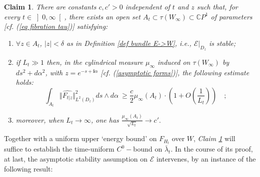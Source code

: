 \documentclass{article}
\newtheorem{claim}[theorem]{Claim}
\begin{document}
\begin{claim}
\label{claim (F hat)_L^2(Dz) > c  over large set} 
There are constants $c,c'>0$  independent of $t$ and $z$ such that, for every $t \in \left]0,\infty \right[$, there exists an open set $A_t\subset\tau(W_\infty)\subset\mathbb{C}P^{1}$   of parameters [cf. (\ref{eq fibration tau})]  satisfying:
\begin{enumerate}[(1)]
        \item
                $\forall z\in A_t$, $\left\vert z\right\vert <\delta $ as                 in \emph{Definition \ref{def bundle E->W}}, i.e., $\left.\mathcal{E}\right\vert_{D_z}$                 is stable;
        \item 
                if $L_t\gg1$ then, in the cylindrical measure $\mu_{\infty}$ induced on $\tau(W_{\infty})$ by $ds^2+d\alpha^2$, with $z=e^{-s+\mathbf{i}\alpha}$  [cf. (\ref{asymptotic forms})], the following estimate holds:               \begin{displaymath}
                        \boxed{\int_{A_t}\Vert \widehat{F_{t\vert z}}\Vert^{2}_{L^2(D_z)}
                        ds\wedge d\alpha\ 
                        \geq {\frac{c}{2}\mu_{\infty}\left( A_t \right) \cdot
                        \left( 1+O\left(\frac{1}{L_{t}}\right) \right)}}\quad;
                \end{displaymath}
        \item
moreover, when $L_t\to \infty$, one has \;
$\displaystyle
\frac{\mu_{\infty}(A_t) }{ \sqrt{L_t}}\to c'.
$
\end{enumerate}
\end{claim}
Together with a uniform upper `energy bound' on $F_{H_t}$ over $W$,   \emph{Claim \ref{claim (F hat)_L^2(Dz) > c  over large set}} will suffice to establish the time-uniform $%
C^{0}-$bound on $\bar\lambda_t$. In the course of its proof, at last, the asymptotic stability assumption on $\mathcal{E}$ intervenes, by an instance of the following result:
\end{document}
